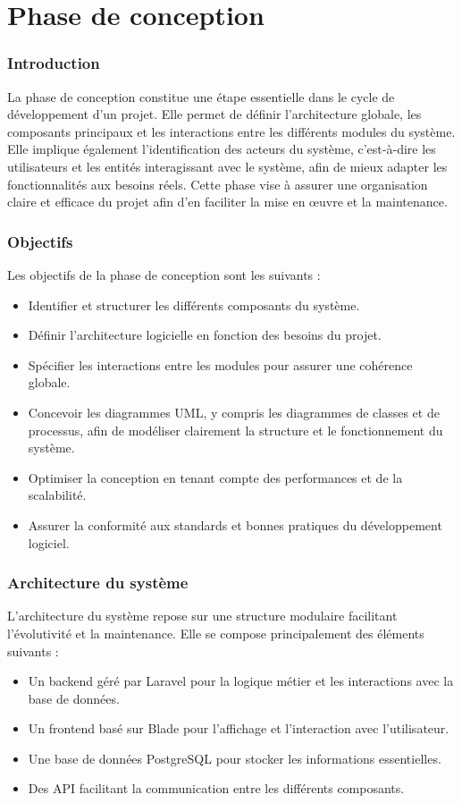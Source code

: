 \chapter{Phase de conception}

\subsection{Introduction}
La phase de conception constitue une étape essentielle dans le cycle de développement d'un projet. Elle permet de définir l'architecture globale, les composants principaux et les interactions entre les différents modules du système. Elle implique également l'identification des acteurs du système, c'est-à-dire les utilisateurs et les entités interagissant avec le système, afin de mieux adapter les fonctionnalités aux besoins réels. Cette phase vise à assurer une organisation claire et efficace du projet afin d'en faciliter la mise en œuvre et la maintenance.

\subsection{Objectifs}
Les objectifs de la phase de conception sont les suivants :
\begin{itemize}
    \item Identifier et structurer les différents composants du système.
    \item Définir l'architecture logicielle en fonction des besoins du projet.
    \item Spécifier les interactions entre les modules pour assurer une cohérence globale.
    \item Concevoir les diagrammes UML, y compris les diagrammes de classes et de processus, afin de modéliser clairement la structure et le fonctionnement du système.
    \item Optimiser la conception en tenant compte des performances et de la scalabilité.
    \item Assurer la conformité aux standards et bonnes pratiques du développement logiciel.
\end{itemize}

\subsection{Architecture du système}
L'architecture du système repose sur une structure modulaire facilitant l'évolutivité et la maintenance. Elle se compose principalement des éléments suivants :
\begin{itemize}
    \item Un backend géré par Laravel pour la logique métier et les interactions avec la base de données.
    \item Un frontend basé sur Blade pour l'affichage et l'interaction avec l'utilisateur.
    \item Une base de données PostgreSQL pour stocker les informations essentielles.
    \item Des API facilitant la communication entre les différents composants.
\end{itemize}

